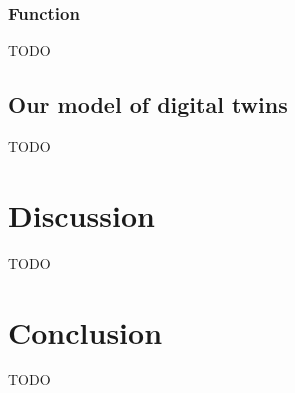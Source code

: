 \documentclass[conference]{IEEEtran}
\begin{document}
    \subsubsection{Function}
    TODO
    



    \subsection{Our model of digital twins}
    \label{section:theory-twin}
    TODO

    \section{Discussion}
    \label{section:discussion}
    TODO

    \section{Conclusion}
    \label{section:conclusion}
    TODO
    
    
    
    
\end{document}
